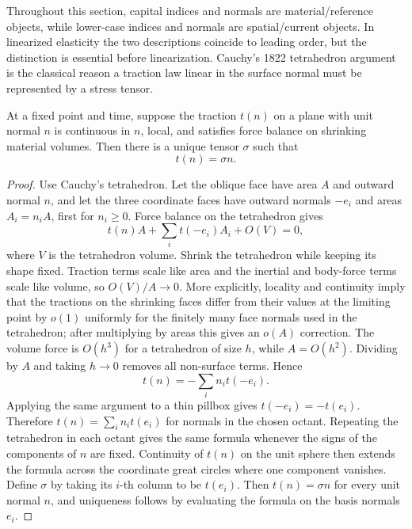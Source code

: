 Throughout this section, capital indices and normals are material/reference
objects, while lower-case indices and normals are spatial/current objects. In
linearized elasticity the two descriptions coincide to leading order, but the
distinction is essential before linearization.
Cauchy's 1822 tetrahedron argument is the classical reason a traction law
linear in the surface normal must be represented by a stress tensor.

\begin{proposition}
At a fixed point and time, suppose the traction \(t(n)\) on a plane with unit
normal \(n\) is continuous in \(n\), local, and satisfies force balance on
shrinking material volumes. Then there is a unique tensor \(\sigma\) such that
\[
  t(n)=\sigma n.
\]
\end{proposition}

\begin{proof}
Use Cauchy's tetrahedron. Let the oblique face have area \(A\) and outward
normal \(n\), and let the three coordinate faces have outward normals
\(-e_i\) and areas \(A_i=n_iA\), first for \(n_i\ge0\). Force balance on the
tetrahedron gives
\[
  t(n)A+\sum_i t(-e_i)A_i+O(V)=0,
\]
where \(V\) is the tetrahedron volume. Shrink the tetrahedron while keeping its
shape fixed. Traction terms scale like area and the inertial and body-force
terms scale like volume, so \(O(V)/A\to0\). More explicitly, locality and
continuity imply that the tractions on the shrinking faces differ from their
values at the limiting point by \(o(1)\) uniformly for the finitely many face
normals used in the tetrahedron; after multiplying by areas this gives an
\(o(A)\) correction. The volume force is \(O(h^3)\) for a tetrahedron of size
\(h\), while \(A=O(h^2)\). Dividing by \(A\) and taking \(h\to0\) removes all
non-surface terms. Hence
\[
  t(n)=-\sum_i n_i t(-e_i).
\]
Applying the same argument to a thin pillbox gives \(t(-e_i)=-t(e_i)\).
Therefore \(t(n)=\sum_i n_i t(e_i)\) for normals in the chosen octant. Repeating
the tetrahedron in each octant gives the same formula whenever the signs of the
components of \(n\) are fixed. Continuity of \(t(n)\) on the unit sphere then
extends the formula across the coordinate great circles where one component
vanishes. Define \(\sigma\) by taking its \(i\)-th column to be \(t(e_i)\).
Then \(t(n)=\sigma n\) for every unit normal \(n\), and uniqueness follows by
evaluating the formula on the basis normals \(e_i\).
\end{proof}

